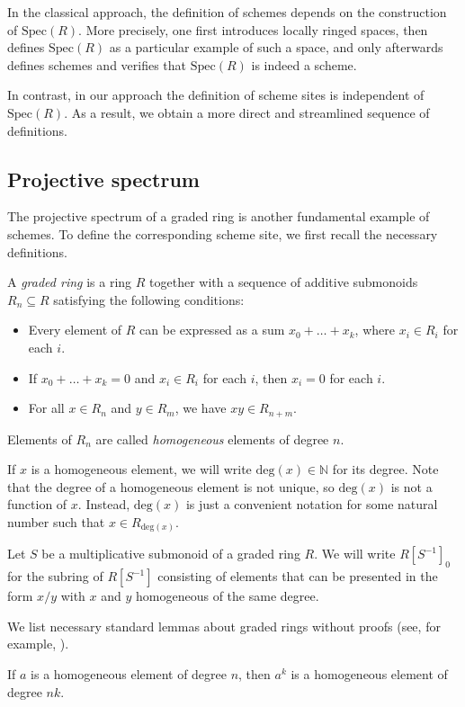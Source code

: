 \documentclass[reqno]{amsart}
\theoremstyle{definition}
\theoremstyle{remark}
\numberwithin{figure}{section}
\renewcommand{\deg}[1]{\mathrm{deg}(#1)}
\begin{document}
In the classical approach, the definition of schemes depends on the construction of $\mathrm{Spec}(R)$.
More precisely, one first introduces locally ringed spaces, then defines $\mathrm{Spec}(R)$ as a particular example of such a space,
and only afterwards defines schemes and verifies that $\mathrm{Spec}(R)$ is indeed a scheme.

In contrast, in our approach the definition of scheme sites is independent of $\mathrm{Spec}(R)$.
As a result, we obtain a more direct and streamlined sequence of definitions.

\subsection{Projective spectrum}

The projective spectrum of a graded ring is another fundamental example of schemes.
To define the corresponding scheme site, we first recall the necessary definitions.

A \emph{graded ring} is a ring $R$ together with a sequence of additive submonoids $R_n \subseteq R$ satisfying the following conditions:
\begin{itemize}
\item Every element of $R$ can be expressed as a sum $x_0 + \ldots + x_k$, where $x_i \in R_i$ for each $i$.
\item If $x_0 + \ldots + x_k = 0$ and $x_i \in R_i$ for each $i$, then $x_i = 0$ for each $i$.
\item For all $x \in R_n$ and $y \in R_m$, we have $xy \in R_{n+m}$.
\end{itemize}
Elements of $R_n$ are called \emph{homogeneous} elements of degree $n$.

If $x$ is a homogeneous element, we will write $\deg{x} \in \mathbb{N}$ for its degree.
Note that the degree of a homogeneous element is not unique, so $\deg{x}$ is not a function of $x$.
Instead, $\deg{x}$ is just a convenient notation for some natural number such that $x \in R_{\deg{x}}$.

Let $S$ be a multiplicative submonoid of a graded ring $R$.
We will write $R[S^{-1}]_0$ for the subring of $R[S^{-1}]$ consisting of elements that can be presented in the form $x/y$ with $x$ and $y$ homogeneous of the same degree.

We list necessary standard lemmas about graded rings without proofs (see, for example, \cite[Tag~00JL]{stacks}).

\begin{lem}
If $a$ is a homogeneous element of degree $n$, then $a^k$ is a homogeneous element of degree $n k$.
\end{lem}
\end{document}
